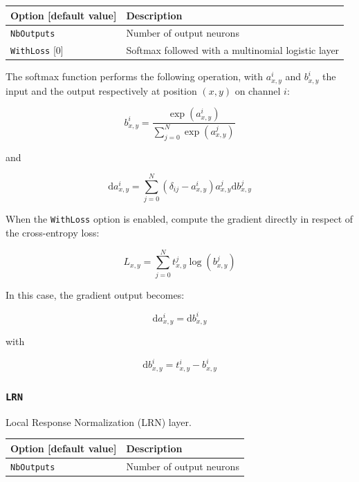 \documentclass[a4paper,11pt,oneside]{article}
\begin{document}
\begin{center}
 \begin{longtable}{| p{5cm} | p{10cm} | }
 \hline
 Option [default value] & Description\\
 \hline\hline
  \cellcolor{requiredcolor}\lstinline!NbOutputs! & Number of output neurons \\
  \lstinline!WithLoss! [0] & Softmax followed with a multinomial logistic
  layer \\
 \hline
\end{longtable}
\end{center}

The softmax function performs the following operation, with $a_{x,y}^{i}$ and
$b_{x,y}^{i}$ the input and the output respectively at position $(x,y)$ on
channel $i$:

\[ b_{x,y}^{i} = \frac{\exp(a_{x,y}^{i})}{\sum\limits_{j=0}^{N}
    {\exp(a_{x,y}^{j})}} \]

and

\[ \text{d}a_{x,y}^{i} = \sum\limits_{j=0}^{N}{\left(\delta_{ij}
- a_{x,y}^{i}\right) a_{x,y}^{j} \text{d}b_{x,y}^{j}} \]


When the \lstinline!WithLoss! option is enabled, compute the gradient directly
in respect of the cross-entropy loss:

\[ L_{x,y} = \sum\limits_{j=0}^{N}{t_{x,y}^{j} \log(b_{x,y}^{j})} \]

In this case, the gradient output becomes:

\[ \text{d}a_{x,y}^{i} = \text{d}b_{x,y}^{i} \]

with

\[ \text{d}b_{x,y}^{i} = t_{x,y}^{i} - b_{x,y}^{i} \]


\subsubsection{\texorpdfstring{%
\lstinline[basicstyle=\ttfamily\bfseries]!LRN!}{LRN}}
Local Response Normalization (LRN) layer.

\begin{center}
 \begin{longtable}{| p{5cm} | p{10cm} | }
 \hline
 Option [default value] & Description\\
 \hline\hline
  \cellcolor{requiredcolor}\lstinline!NbOutputs! & Number of output neurons \\
 \hline
\end{longtable}
\end{center}
\end{document}
